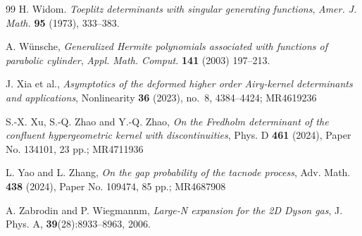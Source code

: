 \documentclass[reqno]{amsart}
\newcommand{\1}{\mathds{1}}
\numberwithin{equation}{section}
\theoremstyle{definition}
\begin{document}
\begin{thebibliography}{99}
 H. Widom. \emph{Toeplitz determinants with singular generating functions}, {\em Amer. J. Math.} {\bf 95} (1973), 333--383.

 A. W\"{u}nsche, \emph{Generalized Hermite polynomials associated with functions of parabolic cylinder}, \textit{Appl. Math. Comput.} \textbf{141} (2003) 197–213.

J. Xia et al., \emph{Asymptotics of the deformed higher order Airy-kernel determinants and applications}, Nonlinearity {\bf 36} (2023), no.~8, 4384--4424; MR4619236

S.-X. Xu, S.-Q. Zhao and Y.-Q. Zhao, \emph{On the Fredholm determinant of the confluent hypergeometric kernel with discontinuities}, Phys. D {\bf 461} (2024), Paper No. 134101, 23 pp.; MR4711936

L. Yao and L. Zhang, \emph{On the gap probability of the tacnode process}, Adv. Math. {\bf 438} (2024), Paper No. 109474, 85 pp.; MR4687908

A. Zabrodin and P. Wiegmannm, \emph{Large-N expansion for the 2D Dyson gas}, J. Phys. A, \textbf{39}(28):8933--8963, 2006.



\end{thebibliography}
\end{document}
